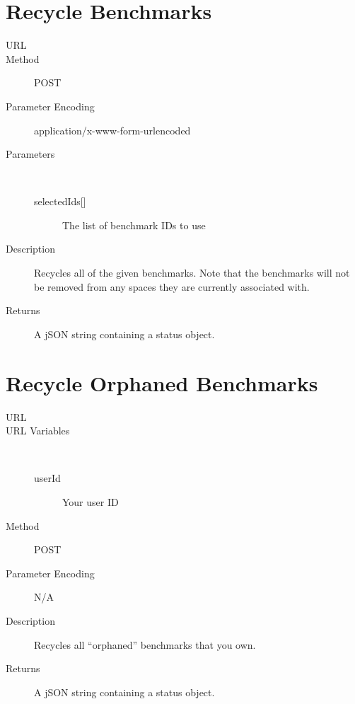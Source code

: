 \section{Recycle Benchmarks}
\begin{description}
\item [URL] 
\item [Method] POST
\item [Parameter Encoding] application/x-www-form-urlencoded
\item [Parameters] \
	\begin{description}
	\item [{selectedIds[]}]  The list of benchmark IDs to use
	\end{description}
\item [Description] Recycles all of the given benchmarks. Note that the benchmarks will not be removed from any spaces they are currently associated with.
\item [Returns] A jSON string containing a status object.
\end{description}


\section{Recycle Orphaned Benchmarks}
\begin{description}
\item [URL] 
\item [URL Variables] \
	\begin{description}
	\item [userId]  Your user ID
	\end{description}
\item [Method] POST
\item [Parameter Encoding] N/A
\item [Description] Recycles all “orphaned” benchmarks that you own.
\item [Returns] A jSON string containing a status object.
\end{description}


